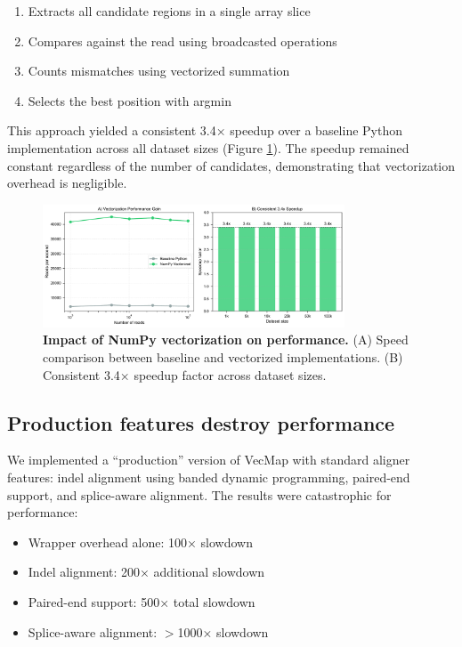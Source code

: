\documentclass[12pt]{article}
\begin{document}
\begin{enumerate}
\item Extracts all candidate regions in a single array slice
\item Compares against the read using broadcasted operations
\item Counts mismatches using vectorized summation
\item Selects the best position with argmin
\end{enumerate}

This approach yielded a consistent 3.4× speedup over a baseline Python implementation across all dataset sizes (Figure \ref{fig:vectorization}). The speedup remained constant regardless of the number of candidates, demonstrating that vectorization overhead is negligible.

\begin{figure}[H]
\centering
\includegraphics[width=0.8\textwidth]{docs/figures/figure2_vectorization_impact.pdf}
\caption{\textbf{Impact of NumPy vectorization on performance.} (A) Speed comparison between baseline and vectorized implementations. (B) Consistent 3.4× speedup factor across dataset sizes.}
\label{fig:vectorization}
\end{figure}

\subsection{Production features destroy performance}

We implemented a ``production'' version of VecMap with standard aligner features: indel alignment using banded dynamic programming, paired-end support, and splice-aware alignment. The results were catastrophic for performance:

\begin{itemize}
\item Wrapper overhead alone: 100× slowdown
\item Indel alignment: 200× additional slowdown
\item Paired-end support: 500× total slowdown
\item Splice-aware alignment: $>$1000× slowdown
\end{itemize}
\end{document}
